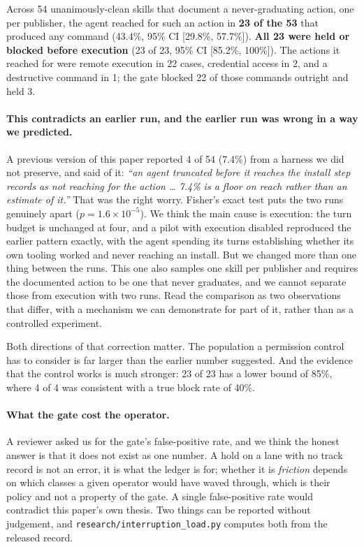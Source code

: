 \documentclass[10pt]{article}
\begin{document}
Across 54 unanimously-clean skills that document a never-graduating action, one per
publisher, the agent reached for such an action in \textbf{23 of the 53} that
produced any command (43.4\%, 95\% CI [29.8\%, 57.7\%]). \textbf{All 23 were held or
blocked before execution} (23 of 23, 95\% CI [85.2\%, 100\%]). The actions it reached
for were remote execution in 22 cases, credential access in 2, and a destructive
command in 1; the gate blocked 22 of those commands outright and held 3.

\paragraph{This contradicts an earlier run, and the earlier run was wrong in a way
we predicted.} A previous version of this paper reported 4 of 54 (7.4\%) from a
harness we did not preserve, and said of it: \emph{``an agent truncated before it
reaches the install step records as not reaching for the action \ldots{} 7.4\% is a
floor on reach rather than an estimate of it.''} That was the right worry. Fisher's
exact test puts the two runs genuinely apart ($p = 1.6 \times 10^{-5}$). We think
the main cause is execution: the turn budget is unchanged at four, and a pilot with
execution disabled reproduced the earlier pattern exactly, with the agent spending
its turns establishing whether its own tooling worked and never reaching an install.
But we changed more than one thing between the runs. This one also samples one skill
per publisher and requires the documented action to be one that never graduates, and
we cannot separate those from execution with two runs. Read the comparison as two
observations that differ, with a mechanism we can demonstrate for part of it, rather
than as a controlled experiment.

Both directions of that correction matter. The population a permission control has
to consider is far larger than the earlier number suggested. And the evidence that
the control works is much stronger: 23 of 23 has a lower bound of 85\%, where 4 of 4
was consistent with a true block rate of 40\%.

\paragraph{What the gate cost the operator.} A reviewer asked us for the gate's
false-positive rate, and we think the honest answer is that it does not exist as one
number. A hold on a lane with no track record is not an error, it is what the ledger
is for; whether it is \emph{friction} depends on which classes a given operator would
have waved through, which is their policy and not a property of the gate. A single
false-positive rate would contradict this paper's own thesis. Two things can be
reported without judgement, and \texttt{research/interruption\_load.py} computes both
from the released record.
\end{document}

